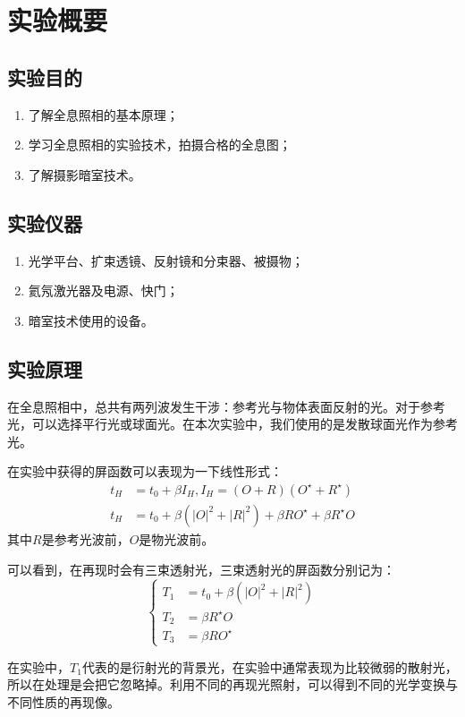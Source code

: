 \documentclass[a4paper]{article}
\begin{document}


\section{实验概要}
\subsection{实验目的}
\begin{enumerate}
    \item 了解全息照相的基本原理；
    \item 学习全息照相的实验技术，拍摄合格的全息图；
    \item 了解摄影暗室技术。
\end{enumerate}
\subsection{实验仪器}
\begin{enumerate}
    \item 光学平台、扩束透镜、反射镜和分束器、被摄物；
    \item 氦氖激光器及电源、快门；
    \item 暗室技术使用的设备。
\end{enumerate}

\subsection{实验原理}
\hspace{2em}在全息照相中，总共有两列波发生干涉：参考光与物体表面反射的光。对于参考光，可以选择平行光或球面光。在本次实验中，我们使用的是发散球面光作为参考光。\par
\hspace{2em} 在实验中获得的屏函数可以表现为一下线性形式：
\begin{align*}
    t_H & =t_0+\beta I_H, I_H=(O+R)(O^\star+R^\star)                 \\
    t_H & =t_0+\beta (|O|^2+|R|^2)+\beta R O^\star + \beta R^\star O
\end{align*}
其中$R$是参考光波前，$O$是物光波前。\par
\hspace{2em} 可以看到，在再现时会有三束透射光，三束透射光的屏函数分别记为：
\begin{equation*}
    \begin{cases}
        T_1 & =t_0+\beta(|O|^2+|R|^2) \\
        T_2 & =\beta R^\star O        \\
        T_3 & =\beta R O^\star
    \end{cases}
\end{equation*}\par
\hspace{2em} 在实验中，$T_1$代表的是衍射光的背景光，在实验中通常表现为比较微弱的散射光，所以在处理是会把它忽略掉。利用不同的再现光照射，可以得到不同的光学变换与不同性质的再现像。 \par
\end{document}
